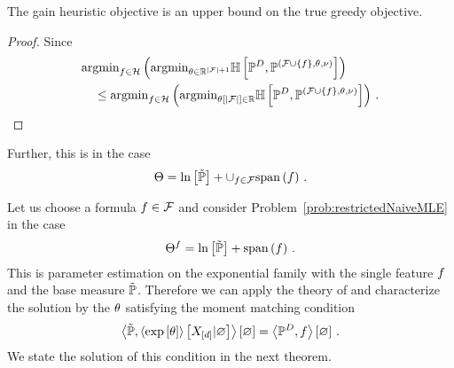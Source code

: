 \begin{lemma}
	The gain heuristic objective is an upper bound on the true greedy objective.
\end{lemma}
\begin{proof}
Since
\begin{align*}
	&\mathrm{argmin}_{f\in\mathcal{H}} \left( \mathrm{argmin}_{\theta\in\mathbb{R}^{\left|\mathcal{F}\right|+1}}
	\mathbb{H}\left[\mathbb{P}^{D},\mathbb{P}^{(\mathcal{F}\cup\{f\},\theta,\nu)}\right] \right) \\
	&\quad \leq 	\mathrm{argmin}_{f\in\mathcal{H}} \left ( \mathrm{argmin}_{\theta\left[\left|\mathcal{F}\right|\right]\in\mathbb{R}}
	\mathbb{H}\left[\mathbb{P}^{D},\mathbb{P}^{(\mathcal{F}\cup\{f\},\theta,\nu)}\right] \right) \, .
\end{align*}
\end{proof}


Further, this is  in the case
\begin{align*}
	\Theta = \ln \left[ \tilde{\mathbb{P}} \right] + \cup_{f\in\mathcal{F}} \mathrm{span}\left(f\right) \, .
\end{align*}



Let us choose a formula $f\in\mathcal{F}$ and consider Problem~\ref{prob:restrictedNaiveMLE}  in the case
\begin{align*}
	\Theta^{f} = \ln \left[ \tilde{\mathbb{P}} \right] + \mathrm{span}\left(f\right) \, .
\end{align*}
This is parameter estimation on the exponential family with the single feature $f$ and the base measure $\tilde{\mathbb{P}}$.
Therefore we can apply the theory of  and characterize the solution by the $\theta$ satisfying the moment matching condition
\begin{align*}
	\left\langle \tilde{\mathbb{P}}, \left\langle \mathrm{exp}\left[\theta\right]\right\rangle \left[ X_{[d]} | \varnothing \right] \right\rangle \left[ \varnothing \right] = \left\langle \mathbb{P}^{D}, f\right\rangle \left[ \varnothing \right] \, .
\end{align*}
We state the solution of this condition in the next theorem.

